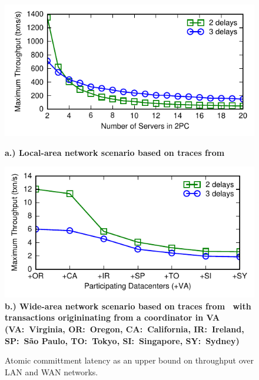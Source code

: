 \begin{figure}
  \includegraphics[width=\columnwidth]{figs/singledc-twopc.pdf}\\ {\centering
    \textbf{\scriptsize a.) Local-area network scenario based on
      traces from~\cite{bobtail}}\par}
  \includegraphics[width=\columnwidth]{figs/multidc-twopc.pdf}\\ \textbf{\scriptsize
    b.) Wide-area network scenario based on traces
    from~\cite{hat-vldb} with transactions origininating from a
    coordinator in VA (VA:~Virginia, OR:~Oregon, CA:~California,
    IR:~Ireland, SP:~S\~{a}o Paulo, TO:~Tokyo, SI:~Singapore,
    SY:~Sydney)}

\caption{Atomic committment latency as an upper bound on throughput
  over LAN and WAN networks.}
\label{fig:2pc}
\end{figure}

